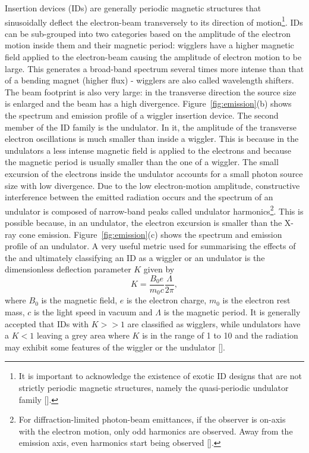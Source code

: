 \begin{refsection}
Insertion devices (IDs) are generally periodic magnetic structures that sinusoidally deflect the electron-beam transversely to its direction of motion\footnote{It is important to acknowledge the existence of exotic ID designs that are not strictly periodic magnetic structures, namely the quasi-periodic undulator family [\cite[\textit{§7.2}]{Elleaume2013}].}. IDs can be sub-grouped into two categories based on the amplitude of the electron motion inside them and their magnetic period: wigglers have a higher magnetic field applied to the electron-beam causing the amplitude of electron motion to be large. This generates a broad-band spectrum several times more intense than that of a bending magnet (higher flux) - wigglers are also called wavelength shifters. The beam footprint is also very large: in the transverse direction the source size is enlarged and the beam has a high divergence. Figure~\ref{fig:emission}(b) shows the spectrum and emission profile of a wiggler insertion device. The second member of the ID family is the undulator. In it, the amplitude of the transverse electron oscillations is much smaller than inside a wiggler. This is because in the undulators a less intense magnetic field is applied to the electrons and because the magnetic period is usually smaller than the one of a wiggler. The small excursion of the electrons inside the undulator accounts for a small photon source size with low divergence. Due to the low electron-motion amplitude, constructive interference between the emitted radiation occurs and the spectrum of an undulator is composed of narrow-band peaks called undulator harmonics\footnote{For diffraction-limited photon-beam emittances, if the observer is on-axis with the electron motion, only odd harmonics are observed. Away from the emission axis, even harmonics start being observed [\cite[\textit{§4.2}]{Clarke2004}].}. This is possible because, in an undulator, the electron excursion is smaller than the X-ray cone emission. Figure~\ref{fig:emission}(c) shows the spectrum and emission profile of an undulator. A very useful metric used for summarising the effects of the and ultimately classifying an ID as a wiggler or an undulator is the dimensionless deflection parameter $K$ given by
\begin{equation}
    K=\frac{B_0e}{m_0c}\frac{\Lambda}{2\pi},
\end{equation}
where $B_0$ is the magnetic field, $e$ is the electron charge, $m_0$ is the electron rest mass, $c$ is the light speed in vacuum and $\Lambda$ is the magnetic period. It is generally accepted that IDs with $K>>1$ are classified as wigglers, while undulators have a $K<1$ leaving a grey area where $K$ is in the range of 1 to 10 and the radiation may exhibit some features of the wiggler or the undulator [\cite[§3.1]{Clarke2004}].


\end{refsection}
